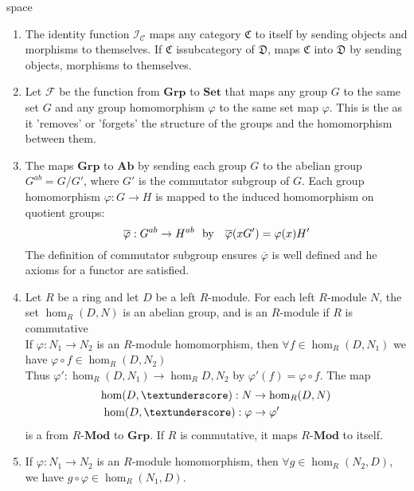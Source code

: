 \begin{example}{\color{white}space}
\begin{enumerate}[label=(\roman*)]
\setlength{\itemsep}{0pt}
\item The identity function $\mathcal{I}_{\mathcal{C}}$ maps any category $\mathfrak{C}$ to itself by sending objects and morphisms to themselves. If $\mathfrak{C}$ issubcategory of $\mathfrak{D}$,  maps $\mathfrak{C}$ into $\mathfrak{D}$ by sending objects, morphisms to themselves.
\item Let $\mathcal{F}$ be the function from $\textbf{Grp}$ to $\textbf{Set}$ that maps any group $G$ to the same set $G$ and any group homomorphism $\varphi$ to the same set map $\varphi$. This is the  as it 'removes' or 'forgets' the structure of the groups and the homomorphism between them.
\item The  maps $\textbf{Grp}$ to $\textbf{Ab}$ by sending each group $G$ to the abelian group $G^{ab} = G/G'$, where $G'$ is the commutator subgroup of $G$. Each group homomorphism $\varphi: G \rightarrow H$ is mapped to the induced homomorphism on quotient groups:
\begin{equation}
\overline{\varphi}: G^{ab} \rightarrow H^{ab} \textnormal{\ \ by \ \ } \overline{\varphi}(xG') = \varphi(x)H' \nonumber
\end{equation}
The definition of commutator subgroup ensures $\overline{\varphi}$ is well defined and he axioms for a functor are satisfied.
\item Let $R$ be a ring and let $D$ be a left $R$-module. For each left $R$-module $N$, the set $\hom_R(D,N)$ is an abelian group, and is an $R$-module if $R$ is commutative\\
If $\varphi: N_1 \rightarrow N_2$ is an $R$-module homomorphism, then $\forall f \in \hom_R (D, N_1)$ we have $\varphi \circ f \in \hom_R (D, N_2)$\\
Thus $\varphi': \hom_R(D, N_1) \rightarrow \hom_R {D, N_2}$ by $\varphi'(f) = \varphi \circ f$. The map
\begin{align}
\hom(D,\textunderscore): N &\rightarrow \hom_R (D,N) \nonumber \\
\hom(D,\textunderscore): \varphi &\rightarrow \varphi' \nonumber
\end{align}
is a  from $R$-$\textbf{Mod}$ to $\textbf{Grp}$. If $R$ is commutative, it maps $R$-$\textbf{Mod}$ to itself.
\item If $\varphi: N_1 \rightarrow N_2$ is an $R$-module homomorphism, then $\forall g \in \hom_R (N_2, D)$, we have $g \circ \varphi \in \hom_R(N_1, D)$.

\end{enumerate}
\end{example}
